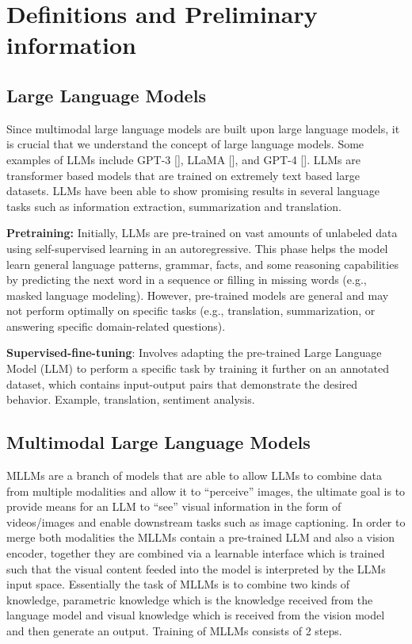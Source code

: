 \documentclass[twocolumn, 9pt]{extarticle}
\begin{document}
\section{Definitions and Preliminary information}
\subsection{Large Language Models}
Since multimodal large language models are built upon large language models, it is crucial that we understand the concept of large language models. Some examples of LLMs include GPT-3 [], LLaMA [], and GPT-4 []. LLMs are transformer based models that are trained on extremely text based large datasets. LLMs have been able to show promising results in several language tasks such as information extraction, summarization and translation. 


\textbf{Pretraining:} Initially, LLMs are pre-trained on vast amounts of unlabeled data using self-supervised learning in an autoregressive. This phase helps the model learn general language patterns, grammar, facts, and some reasoning capabilities by predicting the next word in a sequence or filling in missing words (e.g., masked language modeling). However, pre-trained models are general and may not perform optimally on specific tasks (e.g., translation, summarization, or answering specific domain-related questions).


\textbf{Supervised-fine-tuning}: Involves adapting the pre-trained Large Language Model (LLM) to perform a specific task by training it further on an annotated dataset, which contains input-output pairs that demonstrate the desired behavior. Example, translation, sentiment analysis. 


\subsection{Multimodal Large Language Models}
MLLMs are a branch of models that are able to allow LLMs to combine data from multiple modalities and allow it to “perceive” images, the ultimate goal is to provide means for an LLM to “see” visual information in the form of videos/images and enable downstream tasks such as image captioning. In order to merge both modalities the MLLMs contain a pre-trained LLM and also a vision encoder, together they are combined via a learnable interface which is trained such that the visual content feeded into the model is interpreted by the LLMs input space. Essentially the task of MLLMs is to combine two kinds of knowledge, parametric knowledge which is the knowledge received from the language model and visual knowledge which is received from the vision model and then generate an output.  
Training of MLLMs consists of 2 steps. 
\end{document}
